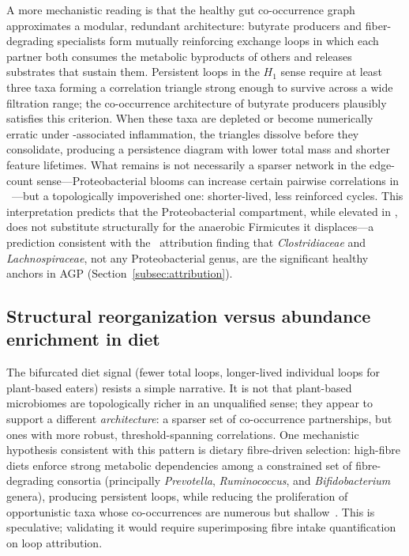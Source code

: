 A more mechanistic reading is that the healthy gut co-occurrence graph
approximates a modular, redundant architecture: butyrate producers and
fiber-degrading specialists form mutually reinforcing exchange loops in
which each partner both consumes the metabolic byproducts of others and
releases substrates that sustain them.
Persistent loops in the $H_1$ sense require at least three taxa forming
a correlation triangle strong enough to survive across a wide filtration
range; the co-occurrence architecture of butyrate producers plausibly
satisfies this criterion.
When these taxa are depleted or become numerically erratic under
\ibd-associated inflammation, the triangles dissolve before they
consolidate, producing a persistence diagram with lower total mass and
shorter feature lifetimes.
What remains is not necessarily a sparser network in the edge-count
sense---Proteobacterial blooms can increase certain pairwise correlations
in \ibd~\citep{halfvarson2017dynamics}---but a topologically impoverished
one: shorter-lived, less reinforced cycles.
This interpretation predicts that the Proteobacterial compartment, while
elevated in \ibd, does not substitute structurally for the anaerobic
Firmicutes it displaces---a prediction consistent with the \loo\ attribution
finding that \textit{Clostridiaceae} and \textit{Lachnospiraceae}, not any
Proteobacterial genus, are the significant healthy anchors in AGP
(Section~\ref{subsec:attribution}).

\subsection{Structural reorganization versus abundance enrichment in diet}

The bifurcated diet signal (fewer total loops, longer-lived individual
loops for plant-based eaters) resists a simple narrative.
It is not that plant-based microbiomes are topologically richer in an
unqualified sense; they appear to support a different \emph{architecture}:
a sparser set of co-occurrence partnerships, but ones with more robust,
threshold-spanning correlations.
One mechanistic hypothesis consistent with this pattern is dietary
fibre-driven selection: high-fibre diets enforce strong metabolic
dependencies among a constrained set of fibre-degrading consortia
(principally \textit{Prevotella}, \textit{Ruminococcus}, and
\textit{Bifidobacterium} genera), producing persistent loops, while
reducing the proliferation of opportunistic taxa whose co-occurrences
are numerous but shallow~\citep{louis2017formation}.
This is speculative; validating it would require superimposing fibre
intake quantification on loop attribution.

